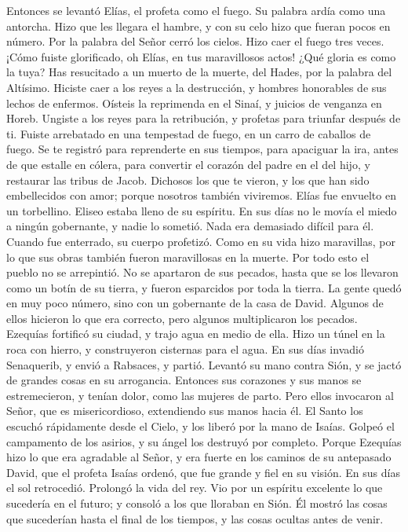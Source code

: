  Entonces se levantó Elías, el profeta como el fuego. Su
palabra ardía como una antorcha.  Hizo que les llegara el
hambre, y con su celo hizo que fueran pocos en número. 
Por la palabra del Señor cerró los cielos. Hizo caer el fuego tres
veces.  ¡Cómo fuiste glorificado, oh Elías, en tus
maravillosos actos! ¿Qué gloria es como la tuya?  Has
resucitado a un muerto de la muerte, del Hades, por la palabra del
Altísimo.  Hiciste caer a los reyes a la destrucción, y
hombres honorables de sus lechos de enfermos.  Oísteis la
reprimenda en el Sinaí, y juicios de venganza en Horeb. 
Ungiste a los reyes para la retribución, y profetas para triunfar
después de ti.  Fuiste arrebatado en una tempestad de
fuego, en un carro de caballos de fuego.  Se te registró
para reprenderte en sus tiempos, para apaciguar la ira, antes de que
estalle en cólera, para convertir el corazón del padre en el del hijo, y
restaurar las tribus de Jacob.  Dichosos los que te
vieron, y los que han sido embellecidos con amor; porque nosotros
también viviremos.  Elías fue envuelto en un torbellino.
Eliseo estaba lleno de su espíritu. En sus días no le movía el miedo a
ningún gobernante, y nadie lo sometió.  Nada era
demasiado difícil para él. Cuando fue enterrado, su cuerpo profetizó.
 Como en su vida hizo maravillas, por lo que sus obras
también fueron maravillosas en la muerte.  Por todo esto
el pueblo no se arrepintió. No se apartaron de sus pecados, hasta que se
los llevaron como un botín de su tierra, y fueron esparcidos por toda la
tierra. La gente quedó en muy poco número, sino con un gobernante de la
casa de David.  Algunos de ellos hicieron lo que era
correcto, pero algunos multiplicaron los pecados. 
Ezequías fortificó su ciudad, y trajo agua en medio de ella. Hizo un
túnel en la roca con hierro, y construyeron cisternas para el agua.
 En sus días invadió Senaquerib, y envió a Rabsaces, y
partió. Levantó su mano contra Sión, y se jactó de grandes cosas en su
arrogancia.  Entonces sus corazones y sus manos se
estremecieron, y tenían dolor, como las mujeres de parto.
 Pero ellos invocaron al Señor, que es misericordioso,
extendiendo sus manos hacia él. El Santo los escuchó rápidamente desde
el Cielo, y los liberó por la mano de Isaías.  Golpeó el
campamento de los asirios, y su ángel los destruyó por completo.
 Porque Ezequías hizo lo que era agradable al Señor, y
era fuerte en los caminos de su antepasado David, que el profeta Isaías
ordenó, que fue grande y fiel en su visión.  En sus días
el sol retrocedió. Prolongó la vida del rey.  Vio por un
espíritu excelente lo que sucedería en el futuro; y consoló a los que
lloraban en Sión.  Él mostró las cosas que sucederían
hasta el final de los tiempos, y las cosas ocultas antes de venir.

